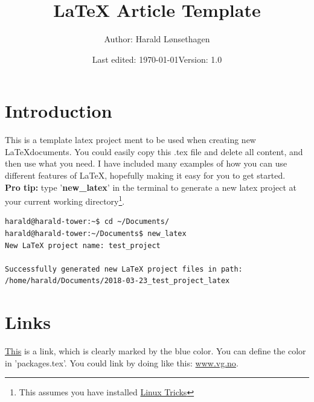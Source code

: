 



\title{\textbf{LaTeX Article Template}}
\author{Author: Harald Lønsethagen}
\date{Last edited: \today\tab Version: 1.0}

\maketitle


\makeatletter
\tableofcontents
\newpage

\section{Introduction}
This is a template latex project ment to be used when creating new \LaTeX \space documents. You could easily copy this .tex file and delete all content, and then use what you need. I have included many examples of how you can use different features of \LaTeX, hopefully making it easy for you to get started.\\
\textbf{Pro tip:} type '\textbf{new\_latex}' in the terminal to generate a new latex project at your current working directory\footnote{This assumes you have installed \href{https://www.tug.org/texshowcase}{Linux Tricks}}.

\begin{lstlisting}[language=bash,caption={Example of getting started}]
harald@harald-tower:~$ cd ~/Documents/
harald@harald-tower:~/Documents$ new_latex
New LaTeX project name: test_project

Successfully generated new LaTeX project files in path:
/home/harald/Documents/2018-03-23_test_project_latex
\end{lstlisting}


\section{Links}
\href{www.vg.no}{This} is a link, which is clearly marked by the blue color. You can define the color in 'packages.tex'. You could link by doing like this: \url{www.vg.no}.
\newpage
